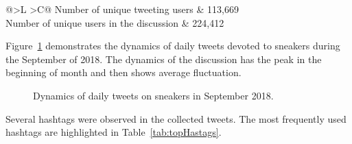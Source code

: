 \begin{table} [htbp]%
	\centering
	\caption{Unique Twitter users.}%
	\label{tab:uniqueTwitterUsers}%
	\renewcommand{\arraystretch}{1.6}%
	\begin{tabulary}{\textwidth}{@{}>{\zz}L >{\zz}C@{}}%
		\toprule     %
		Number of unique tweeting users & 113,669 \\ 
		Number of unique users in the discussion & 224,412  \\
		\bottomrule %
	\end{tabulary}%
\end{table}

Figure~\cref{fig:dailyTweetDynamics} demonstrates the dynamics of daily tweets devoted to sneakers during the September of 2018. The dynamics of the discussion has the peak in the beginning of month and then shows average fluctuation.

\begin{figure}[ht]
	\caption{Dynamics of daily tweets on sneakers in September 2018.}\label{fig:dailyTweetDynamics}
\end{figure}

Several hashtags were observed in the collected tweets. The most frequently used hashtags are highlighted in Table~\cref{tab:topHastags}.

